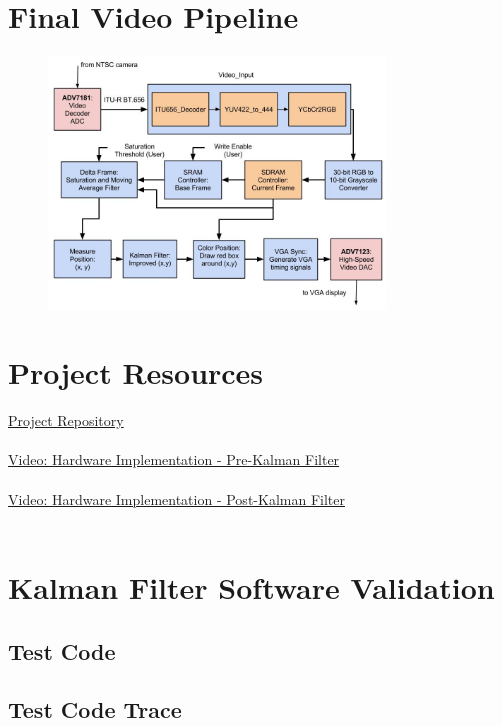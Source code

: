 \documentclass[11pt]{article} %
\begin{document}
\section{Final Video Pipeline}
\label{sec:finalPipe}
\begin{figure}[h]
\centering
\includegraphics[width=0.8\textwidth]{./images/final_pipeline.jpg}
\end{figure}
\section{Project Resources}
\label{sec:links}
\href{https://github.com/bbrown1867/ObjectTracking}{Project Repository} \\\\
\href{https://www.youtube.com/watch?v=8xPpoj7ziko}{Video: Hardware Implementation - Pre-Kalman Filter} \\\\
\href{https://www.youtube.com/watch?v=48JgtHcgVmo}{Video: Hardware Implementation - Post-Kalman Filter} \\\\
\section{Kalman Filter Software Validation}
\label{sec:software}
\subsection{Test Code}
\subsection{Test Code Trace}
\end{document}
